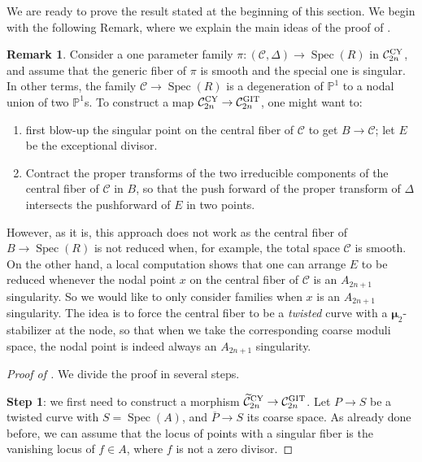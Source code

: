 \documentclass{amsart}
\newcommand{\bP}{\mathbb{P}}
\newcommand{\cB}{\mathcal{B}}
\newcommand{\cC}{\mathcal{C}}
\newcommand{\cR}{\mathcal{R}}
\newcommand{\spec}{\operatorname{Spec}}
\newcommand{\PGL}{\operatorname{PGL}}
\newcommand{\bmu}{\bm{\mu}}
\newcommand{\git}{{\rm GIT}}
\newcommand{\CY}{{\rm CY}}
\theoremstyle{definition}
\newtheorem{Remark}[theorem]{Remark}
\theoremstyle{definition}
\begin{document}
{
We are ready to prove the result stated at the beginning of this section. We begin with the following Remark, where we explain the main ideas of the proof of .
\begin{Remark}\label{remark_why_we_need_twisted_nodes}
    Consider a one parameter family $\pi:(\cC,\Delta)\to \spec(R)$ in $\cC^{\CY}_{2n}$, and assume that the generic fiber of $\pi$ is smooth and the special one is singular. In other terms, the family $\cC\to \spec(R)$ is a degeneration of $\bP^1$ to a nodal union of two $\bP^1$s. To construct a map $\cC^{\CY}_{2n}\to \cC^{\git}_{2n}$, one might want to:
    \begin{enumerate}
        \item first blow-up the singular point on the central fiber of $\cC$ to get $B\to \cC$; let $E$ be the exceptional divisor.
\item Contract the proper transforms of the two irreducible components of the central fiber of $\cC$ in $B$, so that the push forward of the proper transform of $\Delta$ intersects the pushforward of $E$ in two points. 
    \end{enumerate}However, as it is, this approach does not work as the central fiber of $B\to \spec(R)$ is not reduced when, for example, the total space $\cC$ is smooth. On the other hand, a local computation shows that one can arrange $E$ to be reduced whenever the nodal point $x$ on the central fiber of $\cC$ is an $A_{2n+1}$ singularity. So we would like to only consider families when $x$ is an $A_{2n+1}$ singularity. The idea is to force the central fiber to be a \textit{twisted} curve with a $\bmu_2$-stabilizer at the node, so that when we take the corresponding coarse moduli space, the nodal point is indeed always an $A_{2n+1}$ singularity.
\end{Remark}
\begin{proof}[Proof of ]We divide the proof in several steps.

    \noindent
    \textbf{Step 1}: we first need to construct a morphism $\widetilde{\cC}^{\CY}_{2n} \to \cC^{\git}_{2n}$. Let $P\to S$ be a twisted curve with $S=\spec(A)$, and $\overline{P}\to S$ its coarse space. As already done before, we can assume that the locus of points with a singular fiber is the vanishing locus of $f\in A$, where $f$ is not a zero divisor.


\end{proof}}
\end{document}
